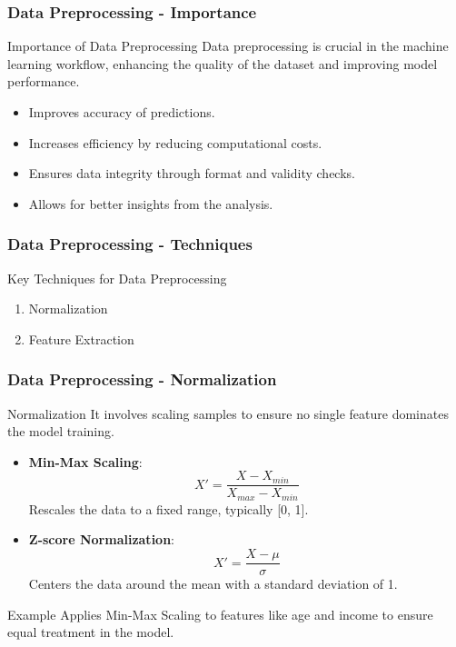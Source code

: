 \documentclass[aspectratio=169]{beamer}
\begin{document}
\begin{frame}[fragile]
    \frametitle{Data Preprocessing - Importance}
    \begin{block}{Importance of Data Preprocessing}
        Data preprocessing is crucial in the machine learning workflow, enhancing the quality of the dataset and improving model performance.
    \end{block}

    \begin{itemize}
        \item Improves accuracy of predictions.
        \item Increases efficiency by reducing computational costs.
        \item Ensures data integrity through format and validity checks.
        \item Allows for better insights from the analysis.
    \end{itemize}
\end{frame}

\begin{frame}[fragile]
    \frametitle{Data Preprocessing - Techniques}
    \begin{block}{Key Techniques for Data Preprocessing}
        \begin{enumerate}
            \item Normalization
            \item Feature Extraction
        \end{enumerate}
    \end{block}
\end{frame}

\begin{frame}[fragile]
    \frametitle{Data Preprocessing - Normalization}
    \begin{block}{Normalization}
        It involves scaling samples to ensure no single feature dominates the model training.
    \end{block}

    \begin{itemize}
        \item \textbf{Min-Max Scaling}:
        \begin{equation}
            X' = \frac{X - X_{min}}{X_{max} - X_{min}}
        \end{equation}
        Rescales the data to a fixed range, typically [0, 1].
        
        \item \textbf{Z-score Normalization}:
        \begin{equation}
            X' = \frac{X - \mu}{\sigma}
        \end{equation}
        Centers the data around the mean with a standard deviation of 1.
    \end{itemize}

    \begin{block}{Example}
        Applies Min-Max Scaling to features like age and income to ensure equal treatment in the model.
    \end{block}
\end{frame}
\end{document}
